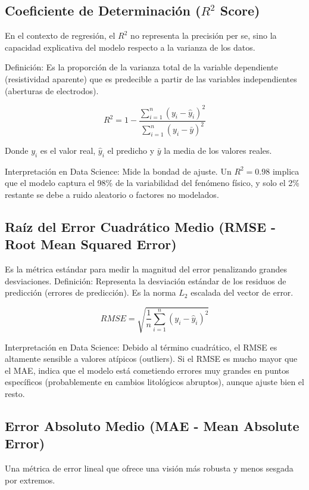 	\subsection{Coeficiente de Determinación ($R^2$ Score)}
	
		En el contexto de regresión, el $R^2$ no representa la precisión per se, sino la capacidad explicativa del modelo respecto a la varianza de los datos.
		
		Definición: Es la proporción de la varianza total de la variable dependiente (resistividad aparente) que es predecible a partir de las variables independientes (aberturas de electrodos).
		
		\[
		R^2 = 1 - \frac{\sum_{i=1}^{n} (y_i - \hat{y}_i)^2}{\sum_{i=1}^{n} (y_i - \bar{y})^2}
		\]
		
		Donde $y_i$ es el valor real, $\hat{y}_i$ el predicho y $\bar{y}$ la media de los valores reales.
		
		Interpretación en Data Science: Mide la bondad de ajuste. Un $R^2 = 0.98$ implica que el modelo captura el 98\% de la variabilidad del fenómeno físico, y solo el 2\% restante se debe a ruido aleatorio o factores no modelados.
	
	\subsection{Raíz del Error Cuadrático Medio (RMSE - Root Mean Squared Error)}
	
		Es la métrica estándar para medir la magnitud del error penalizando grandes desviaciones.
		Definición: Representa la desviación estándar de los residuos de predicción (errores de predicción). Es la norma $L_2$ escalada del vector de error.
		
		\[
		RMSE = \sqrt{\frac{1}{n} \sum_{i=1}^{n} (y_i - \hat{y}_i)^2}
		\]
		
		Interpretación en Data Science: Debido al término cuadrático, el RMSE es altamente sensible a valores atípicos (outliers). Si el RMSE es mucho mayor que el MAE, indica que el modelo está cometiendo errores muy grandes en puntos específicos (probablemente en cambios litológicos abruptos), aunque ajuste bien el resto.
		
	\subsection{Error Absoluto Medio (MAE - Mean Absolute Error)}
	
		Una métrica de error lineal que ofrece una visión más robusta y menos sesgada por extremos.
		
